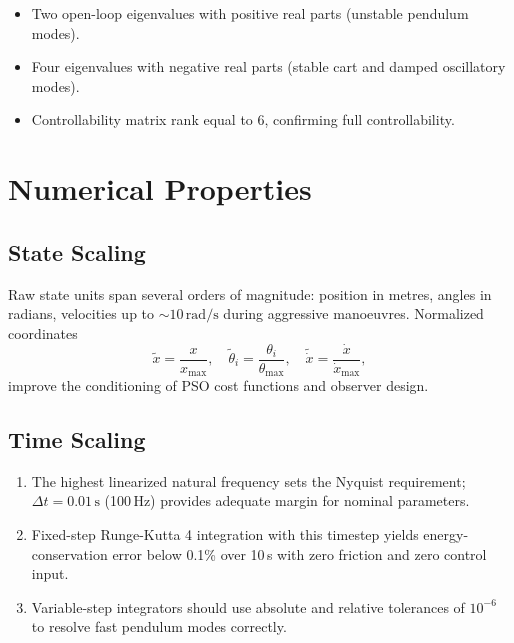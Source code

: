 \documentclass[11pt,a4paper]{article}
\begin{document}
\begin{itemize}
    \item Two open-loop eigenvalues with positive real parts (unstable pendulum
          modes).
    \item Four eigenvalues with negative real parts (stable cart and damped
          oscillatory modes).
    \item Controllability matrix rank equal to 6, confirming full controllability.
\end{itemize}

\section{Numerical Properties}

\subsection{State Scaling}

Raw state units span several orders of magnitude: position in metres, angles in
radians, velocities up to $\sim\!10\,\mathrm{rad/s}$ during aggressive
manoeuvres.  Normalized coordinates
\begin{equation}
    \tilde{x} = \frac{x}{x_{\max}}, \quad
    \tilde{\theta}_i = \frac{\theta_i}{\theta_{\max}}, \quad
    \tilde{\dot{x}} = \frac{\dot{x}}{\dot{x}_{\max}},
\end{equation}
improve the conditioning of PSO cost functions and observer design.

\subsection{Time Scaling}

\begin{enumerate}
    \item The highest linearized natural frequency sets the Nyquist requirement;
          $\Delta t = 0.01\,\mathrm{s}$ (100\,Hz) provides adequate margin for
          nominal parameters.
    \item Fixed-step Runge-Kutta 4 integration with this timestep yields
          energy-conservation error below 0.1\% over 10\,s with zero friction
          and zero control input.
    \item Variable-step integrators should use absolute and relative tolerances
          of $10^{-6}$ to resolve fast pendulum modes correctly.
\end{enumerate}
\end{document}
